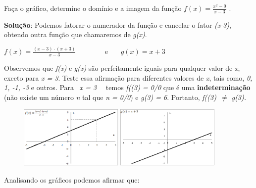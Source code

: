 \begin{texemplo}	
Faça o gráfico, determine o domínio e a imagem da função  \( f \left( x \right) =\frac{x^{2}-9}{x-3} \) .

\begin{justify}
\textbf{Solução}: Podemos fatorar o numerador da função e cancelar o fator \textit{(x-3)}, obtendo outra função que chamaremos de \textit{g(x)}.
\end{justify}

\begin{justify}
\quad \quad  \( f \left( x \right) =\frac{ \left( x-3 \right)  \cdot  \left( x+3 \right) }{x-3} \) ~~~~~~~ e~~~  \( g \left( x \right) =x+3 \) 
\end{justify}

\begin{justify}
Observemos que \textit{f(x)} e \textit{g(x)} são perfeitamente iguais para qualquer valor de \textit{x}, exceto para \textit{x = 3}. Teste essa afirmação para diferentes valores de \textit{x}, tais como, \textit{0, 1, -1, -3} e outros. Para~ \textit{x = 3}~~ temos \textit{f((3) = 0/0} que é uma \textbf{indeterminação }(não existe um número \textit{n} tal que \textit{n = 0/0}) e \textit{g(3) = 6}. Portanto, \textit{f((3)~$ \neq $   g(3).}
\end{justify}

\begin{figure}[H]
	\includegraphics[width=0.45\textwidth]{capitulos/outras_funcoes/media/image14.png} \includegraphics[width=0.45\textwidth]{capitulos/outras_funcoes/media/image15.png}
\end{figure}

\begin{justify}
Analisando os gráficos podemos afirmar que:
\end{justify}


\end{texemplo}
